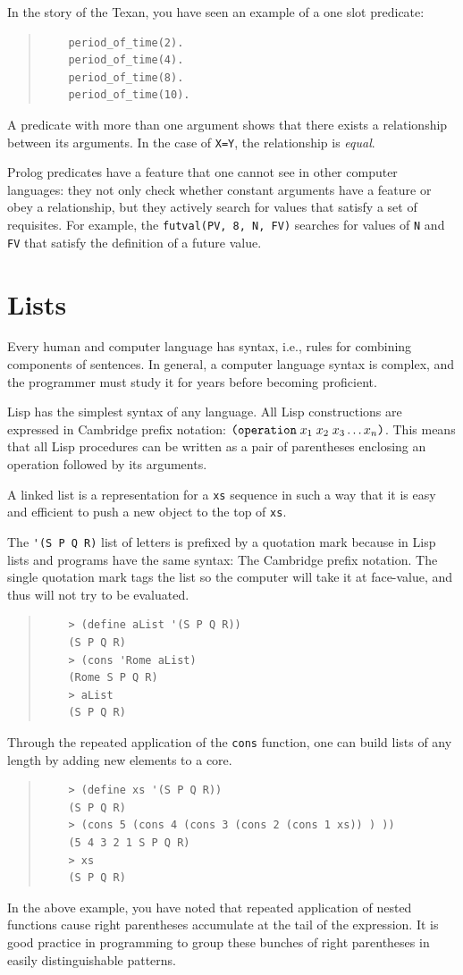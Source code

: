 \documentclass[a4paper,12pt]{book}
\begin{document}
In the story of the Texan, you have seen an example of a one slot predicate:
\begin{quote}
	\begin{verbatim}
	period_of_time(2).
	period_of_time(4).
	period_of_time(8).
	period_of_time(10).
	\end{verbatim}
\end{quote}
A predicate with more than one argument shows that there
exists a relationship between its arguments. In the case of
\verb|X=Y|, the relationship is {\em equal}.

Prolog predicates have a feature that one cannot see in
other computer languages: they not only check whether
constant arguments have a feature or obey a relationship,
but they actively search for values that satisfy a
set of requisites. For example, the \verb|futval(PV, 8, N, FV)|
searches for values of \verb|N| and \verb|FV| that satisfy
the definition of a future value.

\section{Lists}
Every human and computer language
has syntax, i.e., rules for combining
components of sentences.
In general, a computer language
syntax is complex, and the programmer
must study it for years before
becoming proficient.

Lisp has the simplest syntax
of any language. All
Lisp constructions are expressed
in Cambridge prefix notation:
$\verb|(operation|\;x_1\;x_2\;x_3\ldots x_n\verb|)|$.
This means that all Lisp procedures  can be written 
as a pair of parentheses enclosing an operation
followed by its arguments. 

A linked list is a representation for
a \verb|xs| sequence  in such a way
that it is easy and efficient to
push a new object to the top of \verb|xs|.

The \verb|'(S P Q R)| list of letters
is prefixed by a quotation mark because
in Lisp lists and programs have the
same syntax: The Cambridge prefix notation.
The single quotation mark
tags the list so the computer will
take it at face-value, and thus will
not try to be evaluated.
\begin{quote}
	\begin{verbatim}
	> (define aList '(S P Q R))
	(S P Q R)
	> (cons 'Rome aList)
	(Rome S P Q R)
	> aList
	(S P Q R)
	\end{verbatim}
\end{quote}
Through the repeated application of the
\verb|cons| function, one can
build lists of any length
by adding new elements to
a core.
\begin{quote}
	\begin{verbatim}
	> (define xs '(S P Q R))
	(S P Q R)
	> (cons 5 (cons 4 (cons 3 (cons 2 (cons 1 xs)) ) ))
	(5 4 3 2 1 S P Q R)
	> xs
	(S P Q R)
	\end{verbatim}
\end{quote}
In the above example, you have noted
that repeated application of nested functions
cause right parentheses accumulate
at the tail of the expression.
It is good practice in programming
to group these bunches of right parentheses
in easily distinguishable patterns.
\end{document}
